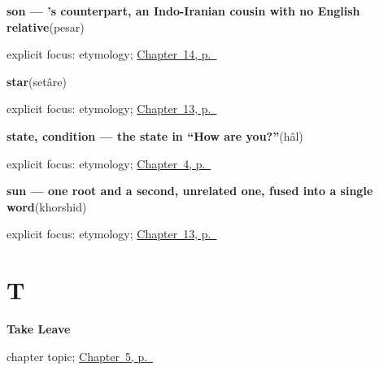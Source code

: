 \noindent\begin{minipage}[t]{\linewidth}
\raggedright
\textbf{son — 's counterpart, an Indo-Iranian cousin with no English relative}\enspace\emph{}\enspace(pesar)\par
\footnotesize explicit focus: etymology; \hyperref[ch:fa-people-words]{Chapter~14, p.~\pageref*{ch:fa-people-words}}
\end{minipage}\par\smallskip

\noindent\begin{minipage}[t]{\linewidth}
\raggedright
\textbf{star}\enspace\emph{}\enspace(setâre)\par
\footnotesize explicit focus: etymology; \hyperref[ch:fa-sky-words]{Chapter~13, p.~\pageref*{ch:fa-sky-words}}
\end{minipage}\par\smallskip

\noindent\begin{minipage}[t]{\linewidth}
\raggedright
\textbf{state, condition — the state in “How are you?”}\enspace\emph{}\enspace(hâl)\par
\footnotesize explicit focus: etymology; \hyperref[ch:fa-how-are-you]{Chapter~4, p.~\pageref*{ch:fa-how-are-you}}
\end{minipage}\par\smallskip

\noindent\begin{minipage}[t]{\linewidth}
\raggedright
\textbf{sun — one root and a second, unrelated one, fused into a single word}\enspace\emph{}\enspace(khorshid)\par
\footnotesize explicit focus: etymology; \hyperref[ch:fa-sky-words]{Chapter~13, p.~\pageref*{ch:fa-sky-words}}
\end{minipage}\par\smallskip

\section*{T}

\noindent\begin{minipage}[t]{\linewidth}
\raggedright
\textbf{Take Leave}\par
\footnotesize chapter topic; \hyperref[ch:fa-take-leave]{Chapter~5, p.~\pageref*{ch:fa-take-leave}}
\end{minipage}\par\smallskip

